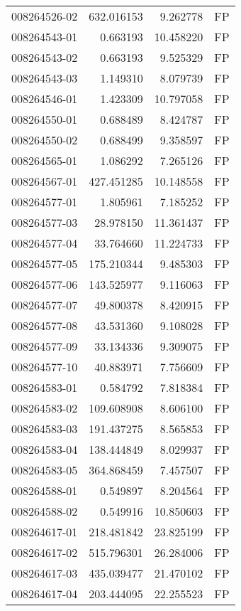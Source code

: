 \begin{tabular}{lrrl}
008264526-02 &  632.016153 &     9.262778 &   FP \\
008264543-01 &    0.663193 &    10.458220 &   FP \\
008264543-02 &    0.663193 &     9.525329 &   FP \\
008264543-03 &    1.149310 &     8.079739 &   FP \\
008264546-01 &    1.423309 &    10.797058 &   FP \\
008264550-01 &    0.688489 &     8.424787 &   FP \\
008264550-02 &    0.688499 &     9.358597 &   FP \\
008264565-01 &    1.086292 &     7.265126 &   FP \\
008264567-01 &  427.451285 &    10.148558 &   FP \\
008264577-01 &    1.805961 &     7.185252 &   FP \\
008264577-03 &   28.978150 &    11.361437 &   FP \\
008264577-04 &   33.764660 &    11.224733 &   FP \\
008264577-05 &  175.210344 &     9.485303 &   FP \\
008264577-06 &  143.525977 &     9.116063 &   FP \\
008264577-07 &   49.800378 &     8.420915 &   FP \\
008264577-08 &   43.531360 &     9.108028 &   FP \\
008264577-09 &   33.134336 &     9.309075 &   FP \\
008264577-10 &   40.883971 &     7.756609 &   FP \\
008264583-01 &    0.584792 &     7.818384 &   FP \\
008264583-02 &  109.608908 &     8.606100 &   FP \\
008264583-03 &  191.437275 &     8.565853 &   FP \\
008264583-04 &  138.444849 &     8.029937 &   FP \\
008264583-05 &  364.868459 &     7.457507 &   FP \\
008264588-01 &    0.549897 &     8.204564 &   FP \\
008264588-02 &    0.549916 &    10.850603 &   FP \\
008264617-01 &  218.481842 &    23.825199 &   FP \\
008264617-02 &  515.796301 &    26.284006 &   FP \\
008264617-03 &  435.039477 &    21.470102 &   FP \\
008264617-04 &  203.444095 &    22.255523 &   FP \\

\end{tabular}
